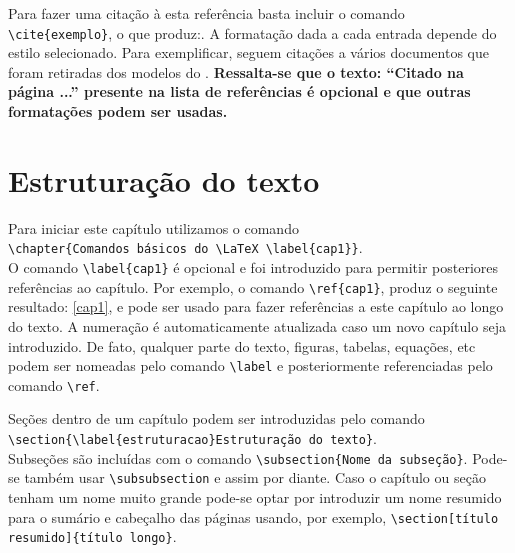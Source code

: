 Para fazer uma citação à esta referência basta incluir o comando \verb+\cite{exemplo}+, o que produz:. A formatação dada
a cada entrada depende do estilo selecionado. Para exemplificar, seguem citações a vários documentos que foram retiradas dos modelos do
\abnTeX\:.
\textbf{Ressalta-se que o texto: ``Citado na página ...'' presente na lista de referências é opcional e que outras formatações podem
ser usadas.}

\newpage


\section{\label{estruturacao}Estruturação do texto}

Para iniciar este capítulo utilizamos o comando \\ \verb+\chapter{Comandos básicos do \LaTeX \label{cap1}}+.\\ O comando
\verb+\label{cap1}+ é opcional e foi introduzido para permitir posteriores referências ao capítulo. Por exemplo, o comando
\verb+\ref{cap1}+, produz o seguinte resultado: \ref{cap1}, e pode ser usado para fazer referências a este capítulo ao longo do texto.
A numeração é automaticamente atualizada caso um novo capítulo seja introduzido. De fato, qualquer parte do texto, figuras, tabelas,
equações, etc podem ser nomeadas pelo comando \verb+\label+ e posteriormente referenciadas pelo comando \verb+\ref+.

Seções dentro de um capítulo podem ser introduzidas pelo comando \\ \verb+\section{\label{estruturacao}Estruturação do texto}+. \\
Subseções são incluídas com o comando \verb+\subsection{Nome da subseção}+. Pode-se também usar \verb+\subsubsection+ e assim por
diante. Caso o capítulo ou seção tenham um nome muito grande pode-se optar por introduzir um  nome resumido para o sumário e cabeçalho
das páginas usando, por exemplo, \verb+\section[título resumido]{título longo}+.

